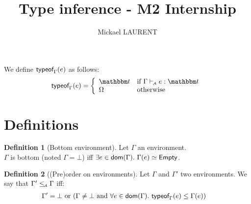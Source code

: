 \documentclass[a4paper]{article}
\title{\vspace{1.5cm}Type inference - M2 Internship}
\author{Mickael LAURENT}
\date{\vspace{-5ex}}
\theoremstyle{definition}
\newtheorem{definition}{Definition}
\begin{document}
  \maketitle

  We define $\textsf{typeof}_{\Gamma}(e)$ as follows:
  \begin{align*}
    \tyof e \Gamma = 
    \left\{\begin{array}{ll}
      \ts & \text{if } \Gamma \vdashA e:\ts \\
      \tsempty & \text{otherwise}
    \end{array}\right.
  \end{align*}

  \section{Definitions}

    \begin{definition}[Bottom environment]
      Let $\Gamma$ an environment.\\
      $\Gamma$ is bottom (noted $\Gamma = \bot$) iff $\exists e\in\dom\Gamma.\ \Gamma(e)\simeq\Empty$.
    \end{definition}

    \begin{definition}[(Pre)order on environments]
    Let $\Gamma$ and $\Gamma'$ two environments. We say that $\Gamma' \leq_{\!\scriptscriptstyle\mathcal{A}} \Gamma$ iff:
    \begin{align*}
        &\Gamma'=\bot \text{ or } (\Gamma\neq\bot \text{ and } \forall e \in \textsf{dom}(\Gamma).\ \textsf{typeof}_{\Gamma}(e) \leq \Gamma(e))
    \end{align*}
    \end{definition}
\end{document}
